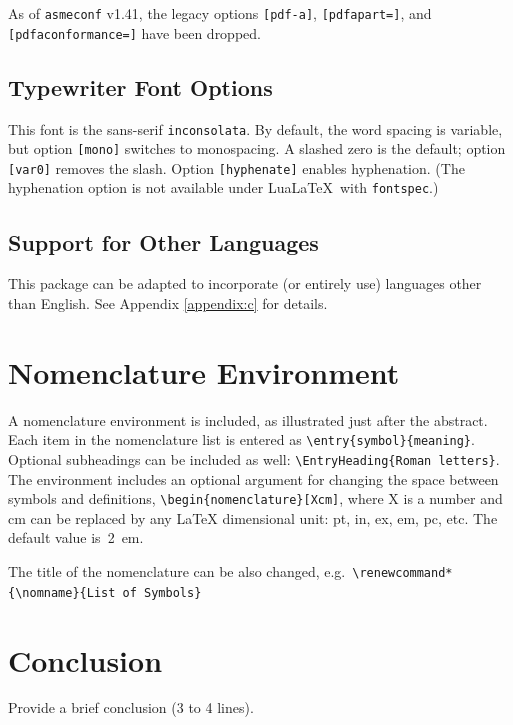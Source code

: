 \documentclass[colorlinks,upint,subscriptcorrection,varvw,balance,loadscripts,german,vietamese]{asmeconf} %
\newcommand*\LuaLaTeX{Lua\LaTeX}
\begin{document}
As of \texttt{asmeconf} v1.41, the legacy options \texttt{[pdf-a]}, \texttt{[pdfapart=]}, and \texttt{[pdfaconformance=]} have been dropped.

\subsection{Typewriter Font Options} This font is the sans-serif \texttt{inconsolata}. By default, the word spacing is variable, but option \texttt{[mono]} switches to monospacing. A slashed zero is the default; option \texttt{[var0]} removes the slash. Option \texttt{[hyphenate]} enables hyphenation. (The hyphenation option is not available under \LuaLaTeX\  with \texttt{fontspec}.)

\subsection{Support for Other Languages}  This package can be adapted to incorporate (or entirely use) languages other than English. See Appendix \ref{appendix:c} for details.



\section{Nomenclature Environment}
A nomenclature environment is included, as illustrated just after the abstract.  Each item in the nomenclature list is entered as \verb|\entry{symbol}{meaning}|.  Optional subheadings can be included as well: \verb|\EntryHeading{Roman letters}|.  The environment includes an optional argument for changing the space between symbols and definitions, 
\verb|\begin{nomenclature}[Xcm]|, where X is a number and cm can be replaced by any LaTeX dimensional unit: pt, in, ex, em, pc, etc. The default value is~2~em.

The title of the nomenclature can be also changed, e.g.\ \verb|\renewcommand*{\nomname}{List of Symbols}|




\section{Conclusion}
Provide a brief conclusion (3 to 4 lines).
\end{document}
